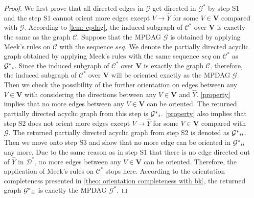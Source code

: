 \documentclass{article} %
\begin{document}
\begin{proof}
    We first prove that all directed edges in $\mathcal{G}$ get directed in $\mathcal{G^{*}}$ by step S1 and the step S1 cannot orient more edges except $V \rightarrow \hat{Y}$ for some $V \in \mathbf{V}$ compared with $\mathcal{G}$. According to \cref{lem: cpdag}, the induced subgraph of $\mathcal{C^{*}}$ over $\mathbf{V}$ is exactly the same as the graph $\mathcal{C}$. Suppose that the MPDAG $\mathcal{G}$ is obtained by applying Meek's rules on $\mathcal{C}$ with the sequence $seq$. We denote the partially directed acyclic graph obtained by applying Meek's rules with the same sequence $seq$ on $\mathcal{C^{*}}$ as $\mathcal{G^{*}}_{\uppercase\expandafter{\romannumeral1}}$. Since the induced subgraph of $\mathcal{C^{*}}$ over $\mathbf{V}$ is exactly the graph $\mathcal{C}$, therefore, the induced subgraph of $\mathcal{C^{*}}$ over $\mathbf{V}$ will be oriented exactly as the MPDAG $\mathcal{G}$. Then we check the possibility of the further orientation on edges between any $V \in \mathbf{V}$ with considering the directions between any $V \in \mathbf{V}$ and $\hat{Y}$. 
    \ref{property} implies that no more edges between any $V \in \mathbf{V}$ can be oriented. The returned partially directed acyclic graph from this step is $\mathcal{G^{*}}_{\uppercase\expandafter{\romannumeral1}}$.
    \ref{property} also implies that step S2 does not orient more edges except $V \rightarrow \hat{Y}$ for some $V \in \mathbf{V}$ compared with $\mathcal{G}$. The returned partially directed acyclic graph from step S2 is denoted as $\mathcal{G^{*}}_{\uppercase\expandafter{\romannumeral2}}$.
    Then we move onto step S3 and show that no more edge can be oriented in $\mathcal{G^{*}}_{\uppercase\expandafter{\romannumeral2}}$ any more. Due to the same reason as in step S1 that there is no edge directed out of $\hat{Y}$ in $\mathcal{D^{*}}$, no more edges between any $V \in \mathbf{V}$ can be oriented. Therefore, the application of Meek's rules on $\mathcal{C^{*}}$ stops here. According to the orientation completeness presented in \cref{theo: orientation completeness with bk}, the returned graph $\mathcal{G^{*}}_{\uppercase\expandafter{\romannumeral2}}$ is exactly the MPDAG $\mathcal{G^{*}}$.
\end{proof}
\end{document}
